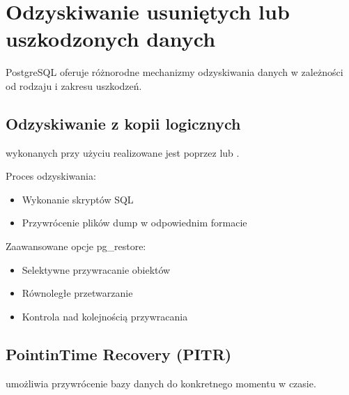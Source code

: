 \documentclass[a4paper,11pt,polish]{sphinxmanual}
\begin{document}
\section{Odzyskiwanie usuniętych lub uszkodzonych danych}
\label{\detokenize{Kopie_zapasowe_i_odzyskiwanie_danych/kopie_zapasowe_i_odzyskiwanie_danych:odzyskiwanie-usunietych-lub-uszkodzonych-danych}}
\sphinxAtStartPar
PostgreSQL oferuje różnorodne mechanizmy odzyskiwania danych w zależności od rodzaju i zakresu uszkodzeń.


\subsection{Odzyskiwanie z kopii logicznych}
\label{\detokenize{Kopie_zapasowe_i_odzyskiwanie_danych/kopie_zapasowe_i_odzyskiwanie_danych:odzyskiwanie-z-kopii-logicznych}}
\sphinxAtStartPar
{} wykonanych przy użyciu  realizowane jest poprzez  lub .

\sphinxAtStartPar
Proces odzyskiwania:
\begin{itemize}
\item {} 
\sphinxAtStartPar
Wykonanie skryptów SQL

\item {} 
\sphinxAtStartPar
Przywrócenie plików dump w odpowiednim formacie

\end{itemize}

\sphinxAtStartPar
Zaawansowane opcje pg\_restore:
\begin{itemize}
\item {} 
\sphinxAtStartPar
Selektywne przywracanie obiektów

\item {} 
\sphinxAtStartPar
Równoległe przetwarzanie

\item {} 
\sphinxAtStartPar
Kontrola nad kolejnością przywracania

\end{itemize}


\subsection{Point\sphinxhyphen{}in\sphinxhyphen{}Time Recovery (PITR)}
\label{\detokenize{Kopie_zapasowe_i_odzyskiwanie_danych/kopie_zapasowe_i_odzyskiwanie_danych:point-in-time-recovery-pitr}}
\sphinxAtStartPar
{} umożliwia przywrócenie bazy danych do konkretnego momentu w czasie.
\end{document}
